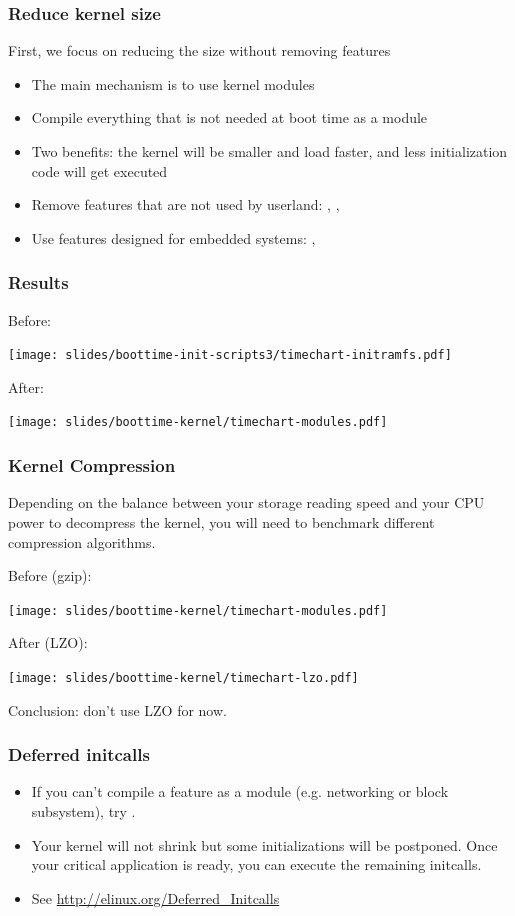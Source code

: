 \begin{frame}
\frametitle{Reduce kernel size}
First, we focus on reducing the size without removing features
\begin{itemize}
	\item The main mechanism is to use kernel modules
	\item Compile everything that is not needed at boot time as a
		module
	\item Two benefits: the kernel will be smaller and load faster, and
		less initialization code will get executed
	\item Remove features that are not used by userland:
		, ,
	\item Use features designed for embedded systems:
		, 
\end{itemize}
\end{frame}

\begin{frame}
\frametitle{Results}
Before:
\begin{center}
    \texttt{[image: slides/boottime-init-scripts3/timechart-initramfs.pdf]}
\end{center}
After:
\begin{center}
    \texttt{[image: slides/boottime-kernel/timechart-modules.pdf]}
\end{center}
\end{frame}

\begin{frame}
\frametitle{Kernel Compression}
\small
Depending on the balance between your storage reading speed and your
CPU power to decompress the kernel, you will need to benchmark
different compression algorithms.

Before (gzip):
\begin{center}
    \texttt{[image: slides/boottime-kernel/timechart-modules.pdf]}
\end{center}
After (LZO):
\begin{center}
    \texttt{[image: slides/boottime-kernel/timechart-lzo.pdf]}
\end{center}
Conclusion: don't use LZO for now.
\end{frame}

\begin{frame}
\frametitle{Deferred initcalls}
\begin{itemize}
\item If you can't compile a feature as a module (e.g. networking or block
      subsystem), try .
\item Your kernel will not shrink but some initializations will be
      postponed. Once your critical application is ready, you can
      execute the remaining initcalls.
\item See \url{http://elinux.org/Deferred_Initcalls}
\end{itemize}
\end{frame}

